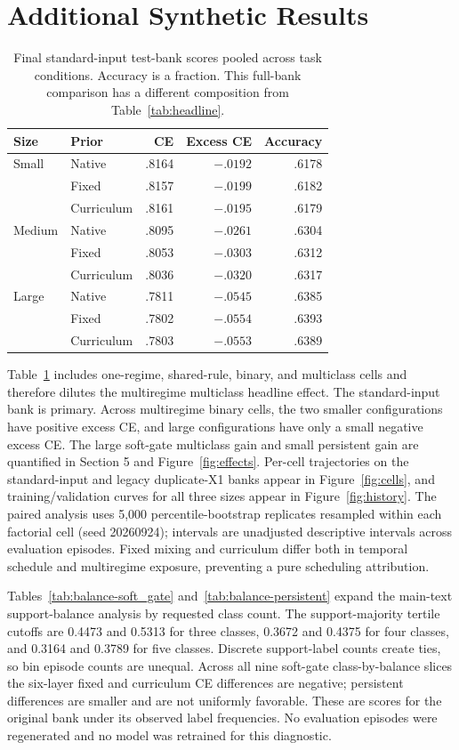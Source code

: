 \documentclass{article}
\begin{document}
\section{Additional Synthetic Results}\label{app:synthetic}
\begin{table}[h]\centering\small
\caption{Final standard-input test-bank scores pooled across task conditions. Accuracy is a fraction. This full-bank comparison has a different composition from Table~\ref{tab:headline}.}\label{tab:fullbank}
\begin{tabular}{@{}llrrr@{}}\toprule Size & Prior & CE & Excess CE & Accuracy\\\midrule
Small & Native & .8164 & $-.0192$ & .6178\\ & Fixed & .8157 & $-.0199$ & .6182\\ & Curriculum & .8161 & $-.0195$ & .6179\\
Medium & Native & .8095 & $-.0261$ & .6304\\ & Fixed & .8053 & $-.0303$ & .6312\\ & Curriculum & .8036 & $-.0320$ & .6317\\
Large & Native & .7811 & $-.0545$ & .6385\\ & Fixed & .7802 & $-.0554$ & .6393\\ & Curriculum & .7803 & $-.0553$ & .6389\\\bottomrule\end{tabular}\end{table}
Table~\ref{tab:fullbank} includes one-regime, shared-rule, binary, and multiclass cells and therefore dilutes the multiregime multiclass headline effect. The standard-input bank is primary. Across multiregime binary cells, the two smaller configurations have positive excess CE, and large configurations have only a small negative excess CE. The large soft-gate multiclass gain and small persistent gain are quantified in Section 5 and Figure~\ref{fig:effects}. Per-cell trajectories on the standard-input and legacy duplicate-X1 banks appear in Figure~\ref{fig:cells}, and training/validation curves for all three sizes appear in Figure~\ref{fig:history}. The paired analysis uses 5,000 percentile-bootstrap replicates resampled within each factorial cell (seed 20260924); intervals are unadjusted descriptive intervals across evaluation episodes. Fixed mixing and curriculum differ both in temporal schedule and multiregime exposure, preventing a pure scheduling attribution.

Tables~\ref{tab:balance-soft_gate} and~\ref{tab:balance-persistent} expand the main-text support-balance analysis by requested class count. The support-majority tertile cutoffs are 0.4473 and 0.5313 for three classes, 0.3672 and 0.4375 for four classes, and 0.3164 and 0.3789 for five classes. Discrete support-label counts create ties, so bin episode counts are unequal. Across all nine soft-gate class-by-balance slices the six-layer fixed and curriculum CE differences are negative; persistent differences are smaller and are not uniformly favorable. These are scores for the original bank under its observed label frequencies. No evaluation episodes were regenerated and no model was retrained for this diagnostic.
\end{document}
